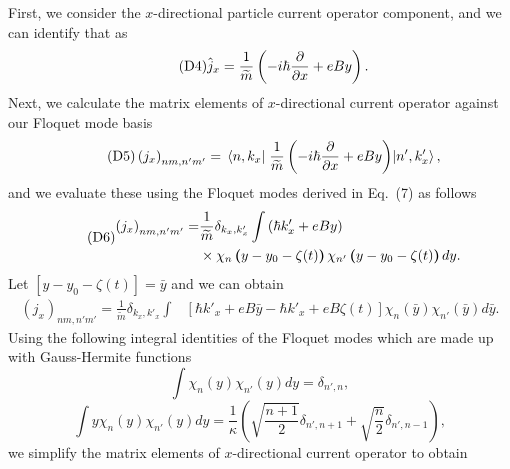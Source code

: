 \documentclass{article}
\begin{document}
\begin{itemize}
{  First, we consider the $x$-directional particle current operator component, and we can identify that as
  \begin{equation} \tag{D4}
    \hat{j}_x = \frac{1}{\widetilde{m}} \left(-i\hbar\pdv{x} + eBy \right).
  \end{equation}
  Next, we calculate the matrix elements of $x$-directional current operator against our Floquet mode basis
  \begin{equation} \tag{D5}
    \left({j}_x \right)_{nm,n'm'} =
    \mel{n,k_x}{\;\frac{1}{\widetilde{m}} \left(-i\hbar\pdv{x} + eBy \right)}{n',k'_x},
  \end{equation}
  and we evaluate these using the Floquet modes derived in Eq.~(7) as follows
  \begin{equation} \tag{D6}
    \begin{aligned}
      \left({j}_x \right)_{nm,n'm'} = &
      \frac{1}{{\widetilde{m}}}
      \delta_{k_x,k'_x}
      \int
      \left(\hbar k'_x + eBy\right) \\
      & \times
       \chi_{n}\bm{\left(}y - y_0 - \zeta(t)\bm{\right)}
      \chi_{n'}\bm{\left(}y - y_0 - \zeta(t)\bm{\right)}
      dy.
    \end{aligned}
  \end{equation}
  Let $[y - y_0 - \zeta(t)] = \bar{y}$ and we can obtain
  \begin{equation} \tag{D7}
    \begin{aligned}
      \left({j}_x \right)_{nm,n'm'} =
      \frac{1}{{\widetilde{m}}}
      \delta_{k_x,k'_x}
      \int &
      \left[ \hbar k'_x + eB\bar{y} -\hbar k'_x + eB\zeta(t)\right]
      \chi_{n}(\bar{y})
      \chi_{n'}(\bar{y})
      d\bar{y}.
    \end{aligned}
  \end{equation}
  Using the following integral identities of the Floquet modes which are made up with Gauss-Hermite functions \cite{vedenyapin11,szego59}
  \begin{equation} \tag{D8}
    \int
    \chi_{n}({y})
    \chi_{n'}({y}) d{y} =
    \delta_{n',n},
  \end{equation}
  \begin{equation} \tag{D9}
    \int
    y \chi_{n}({y})\chi_{n'}({y}) d{y} =
    \frac{1}{\kappa}
    \left(\sqrt{\frac{n+1}{2}} \delta_{n',n+1} + \sqrt{\frac{n}{2}}
    \delta_{n',n-1} \right),
  \end{equation}
  we simplify the matrix elements of $x$-directional current operator to obtain
  \begin{equation} \tag{D10}

\end{equation}}
\end{itemize}
\end{document}
